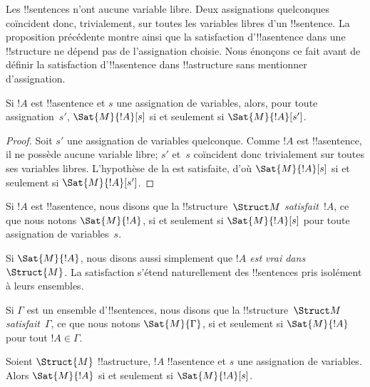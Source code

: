 \documentclass[../../../include/open-logic-section]{subfiles}
\begin{document}
\begin{explain}
Les !!{sentence}s n'ont aucune variable libre. Deux assignations
quelconques coïncident donc, trivialement, sur toutes les variables
libres d'un !!{sentence}. La proposition précédente montre ainsi que
la satisfaction d'!!a{sentence} dans une !!{structure} ne dépend
pas de l'assignation choisie. Nous énonçons ce fait avant de définir
la satisfaction d'!!a{sentence} dans !!a{structure} sans mentionner
d'assignation.
\end{explain}

\begin{cor}
Si $!A$ est !!a{sentence} et $s$ une assignation de variables,
alors, pour toute assignation~$s'$,
$\Sat{M}{!A}[s]$ si et seulement si $\Sat{M}{!A}[s']$.
\end{cor}

\begin{proof}
  Soit $s'$ une assignation de variables quelconque. Comme $!A$ est
  !!a{sentence}, il ne possède aucune variable libre; $s'$ et~$s$
  coïncident donc trivialement sur toutes ses variables libres.
  L'hypothèse de la  est satisfaite, d'où
  $\Sat{M}{!A}[s]$ si et seulement si $\Sat{M}{!A}[s']$.
\end{proof}

\begin{defn}
Si $!A$ est !!a{sentence}, nous disons que la
!!{structure}~$\Struct M$ \emph{satisfait}~$!A$, ce que nous notons
$\Sat{M}{!A}$, si et seulement si $\Sat{M}{!A}[s]$ pour toute
assignation de variables~$s$.
\end{defn}

Si $\Sat{M}{!A}$, nous disons aussi simplement que
\emph{$!A$ est vrai dans~$\Struct{M}$.} La satisfaction s'étend
naturellement des !!{sentence}s pris isolément à leurs ensembles.

\begin{defn}
Si $\Gamma$ est un ensemble d'!!{sentence}s, nous disons que
la !!{structure}~$\Struct M$ \emph{satisfait}~$\Gamma$,
ce que nous notons $\Sat{M}{\Gamma}$, si et seulement si
$\Sat{M}{!A}$ pour tout $!A \in \Gamma$.
\end{defn}

\begin{prop}
  Soient $\Struct{M}$ !!a{structure}, $!A$ !!a{sentence} et $s$
  une assignation de variables. Alors $\Sat{M}{!A}$ si et seulement si
  $\Sat{M}{!A}[s]$.
\end{prop}
\end{document}
